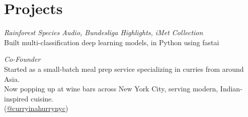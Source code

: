 \documentclass[a4paper]{deedy-resume-openfont} %
\begin{document}
\begin{minipage}[t]{0.33\textwidth}





\section{Projects}
\textit{ Rainforest Species Audio, Bundesliga Highlights, iMet Collection}\\
Built multi-classification deep learning models, in Python using fastai
\sectionsep

\textit{Co-Founder}\\
Started as a small-batch meal prep service specializing in curries from around Asia.\\
Now popping up at wine bars across New York City, serving modern, Indian-inspired cuisine.\\(\href{https://www.instagram.com/curryinahurrynyc/}{@curryinahurrynyc})




\end{minipage}
\end{document}
